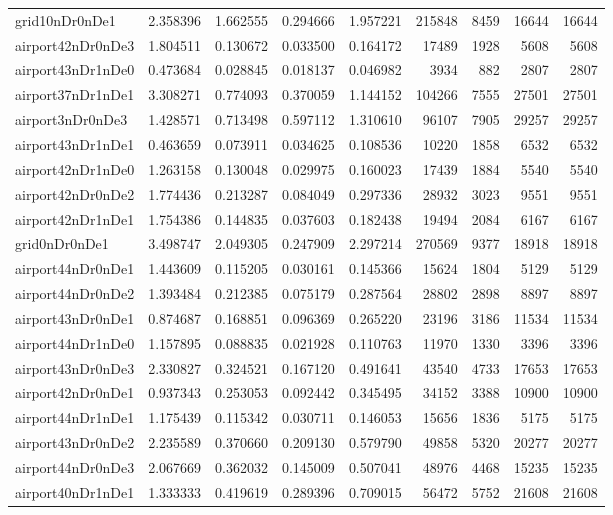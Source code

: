 \begin{longtable}{|l|r|r|r|r|r|r|r|r|}
grid10nDr0nDe1 & 2.358396 & 1.662555 & 0.294666 & 1.957221 & 215848 & 8459 & 16644 & 16644 \\
airport42nDr0nDe3 & 1.804511 & 0.130672 & 0.033500 & 0.164172 & 17489 & 1928 & 5608 & 5608 \\
airport43nDr1nDe0 & 0.473684 & 0.028845 & 0.018137 & 0.046982 & 3934 & 882 & 2807 & 2807 \\
airport37nDr1nDe1 & 3.308271 & 0.774093 & 0.370059 & 1.144152 & 104266 & 7555 & 27501 & 27501 \\
airport3nDr0nDe3 & 1.428571 & 0.713498 & 0.597112 & 1.310610 & 96107 & 7905 & 29257 & 29257 \\
airport43nDr1nDe1 & 0.463659 & 0.073911 & 0.034625 & 0.108536 & 10220 & 1858 & 6532 & 6532 \\
airport42nDr1nDe0 & 1.263158 & 0.130048 & 0.029975 & 0.160023 & 17439 & 1884 & 5540 & 5540 \\
airport42nDr0nDe2 & 1.774436 & 0.213287 & 0.084049 & 0.297336 & 28932 & 3023 & 9551 & 9551 \\
airport42nDr1nDe1 & 1.754386 & 0.144835 & 0.037603 & 0.182438 & 19494 & 2084 & 6167 & 6167 \\
grid0nDr0nDe1 & 3.498747 & 2.049305 & 0.247909 & 2.297214 & 270569 & 9377 & 18918 & 18918 \\
airport44nDr0nDe1 & 1.443609 & 0.115205 & 0.030161 & 0.145366 & 15624 & 1804 & 5129 & 5129 \\
airport44nDr0nDe2 & 1.393484 & 0.212385 & 0.075179 & 0.287564 & 28802 & 2898 & 8897 & 8897 \\
airport43nDr0nDe1 & 0.874687 & 0.168851 & 0.096369 & 0.265220 & 23196 & 3186 & 11534 & 11534 \\
airport44nDr1nDe0 & 1.157895 & 0.088835 & 0.021928 & 0.110763 & 11970 & 1330 & 3396 & 3396 \\
airport43nDr0nDe3 & 2.330827 & 0.324521 & 0.167120 & 0.491641 & 43540 & 4733 & 17653 & 17653 \\
airport42nDr0nDe1 & 0.937343 & 0.253053 & 0.092442 & 0.345495 & 34152 & 3388 & 10900 & 10900 \\
airport44nDr1nDe1 & 1.175439 & 0.115342 & 0.030711 & 0.146053 & 15656 & 1836 & 5175 & 5175 \\
airport43nDr0nDe2 & 2.235589 & 0.370660 & 0.209130 & 0.579790 & 49858 & 5320 & 20277 & 20277 \\
airport44nDr0nDe3 & 2.067669 & 0.362032 & 0.145009 & 0.507041 & 48976 & 4468 & 15235 & 15235 \\
airport40nDr1nDe1 & 1.333333 & 0.419619 & 0.289396 & 0.709015 & 56472 & 5752 & 21608 & 21608 \\

\end{longtable}
